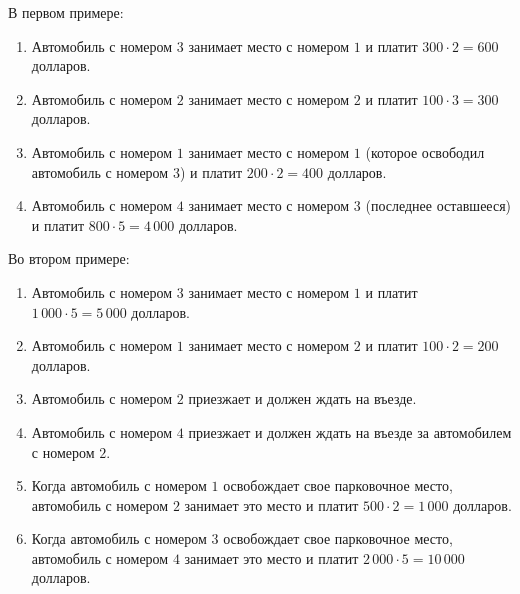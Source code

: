 В первом примере:
\begin{enumerate}
\item Автомобиль с номером $3$ занимает место с номером $1$ и платит $300 \cdot 2 = 600$ долларов.
\item Автомобиль с номером $2$ занимает место с номером $2$ и платит $100 \cdot 3 = 300$ долларов.
\item Автомобиль с номером $1$ занимает место с номером $1$ (которое освободил автомобиль с номером 3) и платит $200 \cdot 2 = 400$ долларов.
\item Автомобиль с номером $4$ занимает место с номером $3$ (последнее оставшееся) и платит $800 \cdot 5 = 4\,000$ долларов.
\end{enumerate}

Во втором примере:

\begin{enumerate}
\item Автомобиль с номером $3$ занимает место с номером $1$ и платит $1\,000 \cdot 5 = 5\,000$ долларов.
\item Автомобиль с номером $1$ занимает место с номером $2$ и платит $100 \cdot 2 = 200$ долларов.
\item Автомобиль с номером $2$ приезжает и должен ждать на въезде.
\item Автомобиль с номером $4$ приезжает и должен ждать на въезде за автомобилем с номером $2$.
\item Когда автомобиль с номером $1$ освобождает свое парковочное место, автомобиль с номером $2$ занимает это место и платит $500 \cdot 2 = 1\,000$ долларов.
\item Когда автомобиль с номером $3$ освобождает свое парковочное место, автомобиль с номером $4$ занимает это место и платит $2\,000 \cdot 5 = 10\,000$ долларов.
\end{enumerate}
